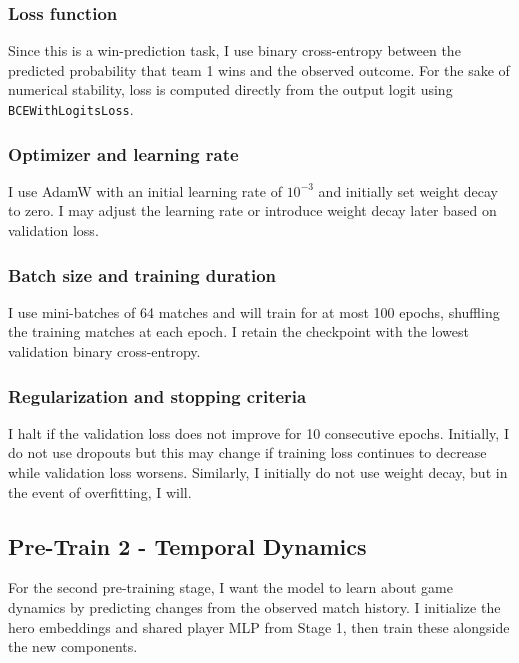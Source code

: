 \documentclass[11pt]{article}
\begin{document}
    \subsubsection{Loss function}
        Since this is a win-prediction task, I use binary cross-entropy between the predicted probability that team 1 wins and the observed outcome. For the sake of numerical stability, loss is computed directly from the output logit using \texttt{BCEWithLogitsLoss}.
    \subsubsection{Optimizer and learning rate}
        I use AdamW with an initial learning rate of $10^{-3}$ and initially set weight decay to zero. I may adjust the learning rate or introduce weight decay later based on validation loss.

    \subsubsection{Batch size and training duration}
        I use mini-batches of 64 matches and will train for at most 100 epochs, shuffling the training matches at each epoch. I retain the checkpoint with the lowest validation binary cross-entropy.

    \subsubsection{Regularization and stopping criteria}
        I halt if the validation loss does not improve for 10 consecutive epochs. Initially, I do not use dropouts but this may change if training loss continues to decrease while validation loss worsens. Similarly, I initially do not use weight decay, but in the event of overfitting, I will.

\subsection{Pre-Train 2 - Temporal Dynamics}
    For the second pre-training stage, I want the model to learn about game dynamics by predicting changes from the observed match history. I initialize the hero embeddings and shared player MLP from Stage 1, then train these alongside the new components.
\end{document}
